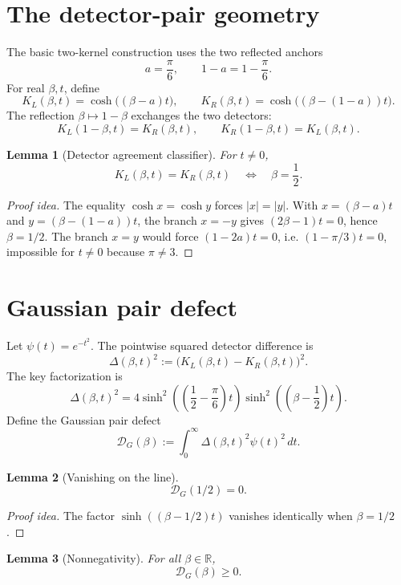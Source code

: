 \documentclass[11pt]{article}
\newtheorem{lemma}{Lemma}
\newcommand{\R}{\mathbb R}
\newcommand{\gpdef}{\mathcal D_G}
\newcommand{\KL}{K_L}
\newcommand{\KR}{K_R}
\begin{document}
\section{The detector-pair geometry}

The basic two-kernel construction uses the two reflected anchors
\[
  a=\frac{\pi}{6},\qquad 1-a=1-\frac{\pi}{6}.
\]
For real \(\beta,t\), define
\[
  \KL(\beta,t)=\cosh\bigl((\beta-a)t\bigr),\qquad
  \KR(\beta,t)=\cosh\bigl((\beta-(1-a))t\bigr).
\]
The reflection \(\beta\mapsto 1-\beta\) exchanges the two detectors:
\[
  \KL(1-\beta,t)=\KR(\beta,t),\qquad
  \KR(1-\beta,t)=\KL(\beta,t).
\]

\begin{lemma}[Detector agreement classifier]
For \(t\ne 0\),
\[
  \KL(\beta,t)=\KR(\beta,t) \quad\Longleftrightarrow\quad \beta=\frac12.
\]
\end{lemma}

\begin{proof}[Proof idea]
The equality \(\cosh x=\cosh y\) forces \(|x|=|y|\).  With
\(x=(\beta-a)t\) and \(y=(\beta-(1-a))t\), the branch \(x=-y\) gives
\((2\beta-1)t=0\), hence \(\beta=1/2\).  The branch \(x=y\) would force
\((1-2a)t=0\), i.e. \((1-\pi/3)t=0\), impossible for \(t\ne0\) because
\(\pi\ne3\).
\end{proof}

\section{Gaussian pair defect}

Let \(\psi(t)=e^{-t^2}\).  The pointwise squared detector difference is
\[
  \Delta(\beta,t)^2 := \bigl(\KL(\beta,t)-\KR(\beta,t)\bigr)^2.
\]
The key factorization is
\[
  \Delta(\beta,t)^2
  =4\sinh^2\!\left(\left(\frac12-\frac\pi6\right)t\right)
     \sinh^2\!\left(\left(\beta-\frac12\right)t\right).
\]
Define the Gaussian pair defect
\[
  \gpdef(\beta)
  :=\int_0^\infty \Delta(\beta,t)^2\psi(t)^2\,dt.
\]

\begin{lemma}[Vanishing on the line]
\[
  \gpdef(1/2)=0.
\]
\end{lemma}

\begin{proof}[Proof idea]
The factor \(\sinh((\beta-1/2)t)\) vanishes identically when \(\beta=1/2\).
\end{proof}

\begin{lemma}[Nonnegativity]
For all \(\beta\in\R\),
\[
  \gpdef(\beta)\ge0.
\]
\end{lemma}
\end{document}
